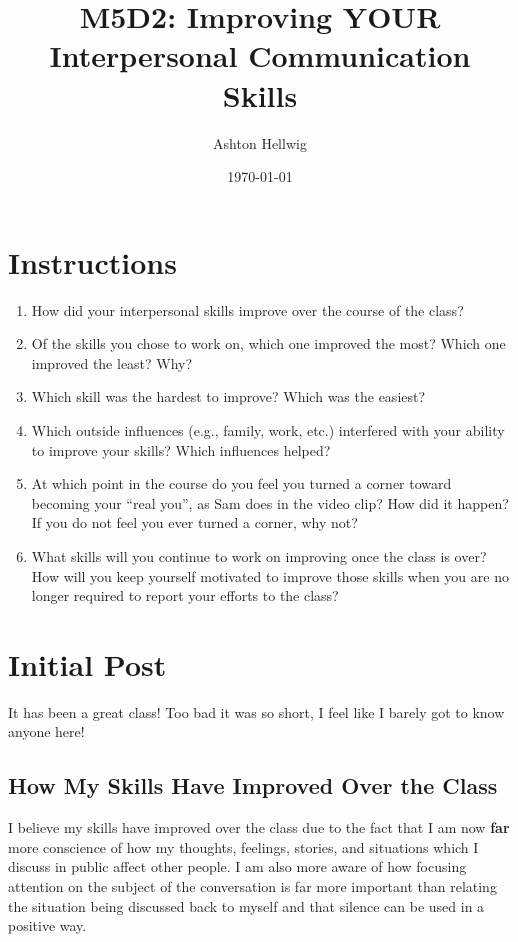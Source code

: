 \documentclass[stu,12pt]{apa7}
\title{%
    M5D2: Improving YOUR Interpersonal Communication Skills
  }
\author{Ashton Hellwig}
\date{\today}
\begin{document}
  \maketitle


  \section*{Instructions}
    \begin{enumerate}
      \item How did your interpersonal skills improve over the course of the
        class?
      \item Of the skills you chose to work on, which one improved the most?
        Which one improved the least? Why?
      \item Which skill was the hardest to improve? Which was the easiest?
      \item Which outside influences (e.g., family, work, etc.) interfered with
        your ability to improve your skills? Which influences helped?
      \item At which point in the course do you feel you turned a corner toward
        becoming your ``real you'', as Sam does in the video clip? How did it
        happen? If you do not feel you ever turned a corner, why not?
      \item What skills will you continue to work on improving once the class
        is over? How will you keep yourself motivated to improve those skills
        when you are no longer required to report your efforts to the class?
    \end{enumerate}


  \newpage
  \section{Initial Post}
    It has been a great class! Too bad it was so short, I feel like I barely
      got to know anyone here!

    \subsection{How My Skills Have Improved Over the Class}
      I believe my skills have improved over the class due to the fact that I am
        now \textbf{far} more conscience of how my thoughts, feelings, stories,
        and situations which I discuss in public affect other people. I am also
        more aware of how focusing attention on the subject of the conversation
        is far more important than relating the situation being discussed back
        to myself and that silence can be used in a positive way.
\end{document}
